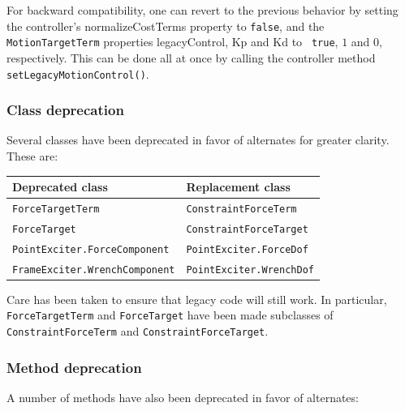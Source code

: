 \documentclass{article}
\begin{document}
For backward compatibility, one can revert to the previous behavior by setting
the controller's {\sf normalizeCostTerms} property to {\tt false}, and the {\tt
MotionTargetTerm} properties {\sf legacyControl}, {\sf Kp} and {\sf Kd} to {\tt
true}, $1$ and $0$, respectively. This can be done all at once by calling the
controller method {\tt setLegacyMotionControl()}.

\subsubsection{Class deprecation}

Several classes have been deprecated in favor of alternates for greater
clarity.  These are:

\begin{center}
\begin{tabular}{ll}
\hline
Deprecated class & Replacement class\\
\hline
{\tt ForceTargetTerm} & {\tt ConstraintForceTerm} \\
{\tt ForceTarget} & {\tt ConstraintForceTarget} \\
{\tt PointExciter.ForceComponent} & {\tt PointExciter.ForceDof} \\
{\tt FrameExciter.WrenchComponent} & {\tt PointExciter.WrenchDof} \\
\hline
\end{tabular}
\end{center}

Care has been taken to ensure that legacy code will still work. In particular,
{\tt ForceTargetTerm} and {\tt ForceTarget} have been made subclasses of {\tt
ConstraintForceTerm} and {\tt ConstraintForceTarget}.

\subsubsection{Method deprecation}

A number of methods have also been deprecated in favor of alternates:
\end{document}
